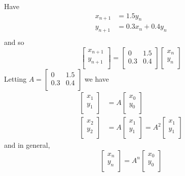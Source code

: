 \documentclass{article}
\begin{document}
\begin{example}
      Have
      \begin{align*}
        x_{n+1} &= 1.5y_n\\
        y_{n+1} &= 0.3x_n + 0.4y_n\\
      \end{align*}
      and so \[
        \begin{bmatrix}
          x_{n+1}\\
          y_{n+1}\\
        \end{bmatrix} =
        \begin{bmatrix}
          0 & 1.5\\
          0.3 & 0.4\\
        \end{bmatrix}
        \begin{bmatrix}
          x_n\\y_n\\
        \end{bmatrix}
      \]
      Letting $A =
      \begin{bmatrix}
        0 & 1.5\\
        0.3 & 0.4\\
      \end{bmatrix}$ we have
      \begin{align*}
        \begin{bmatrix}
          x_1\\y_1\\
        \end{bmatrix} &= A
        \begin{bmatrix}
          x_0\\y_0\\
        \end{bmatrix}\\
        \begin{bmatrix}
          x_2\\y_2\\
        \end{bmatrix} &= A
        \begin{bmatrix}
          x_1\\y_1\\
        \end{bmatrix} = A^2
        \begin{bmatrix}
          x_1\\y_1\\
        \end{bmatrix}
      \end{align*} and in general, \[
        \begin{bmatrix}
          x_n\\y_n\\
        \end{bmatrix} = A^n
        \begin{bmatrix}
          x_0\\y_0\\
        \end{bmatrix}
      \]


\end{example}
\end{document}
